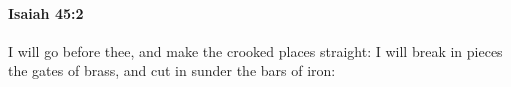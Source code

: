 
		\paragraph{Isaiah 45:2} %
			\label{ISAIAH-45-2}

			I will go before thee, and make the crooked places straight: I will break in pieces the gates of brass, and cut in sunder the bars of iron:


